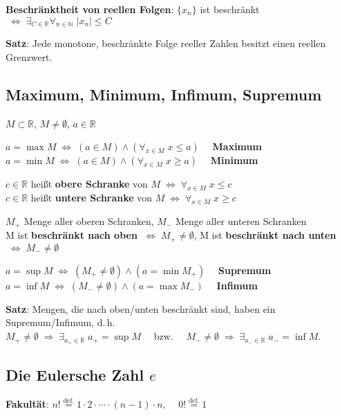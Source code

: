 \textbf{Beschränktheit von reellen Folgen}: $\{x_n\}$ ist beschränkt
$\;\Leftrightarrow\;
\exists_{C \in \mathbb{R}} \forall_{n \in \mathbb{N}}\; |x_n| \le C$

\textbf{Satz}: Jede monotone, beschränkte Folge reeller Zahlen besitzt einen
reellen Grenzwert.

\subsection{%
    Maximum, Minimum, Infimum, Supremum%
}

$M \subset \mathbb{R}$, $M \not= \emptyset$, $a \in \mathbb{R}$

$a = \max{M} \;\Leftrightarrow\;
(a \in M) \land (\forall_{x \in M}\; x \le a) \quad$ \textbf{Maximum} \\
$a = \min{M} \;\Leftrightarrow\;
(a \in M) \land (\forall_{x \in M}\; x \ge a) \quad$ \textbf{Minimum}

$c \in \mathbb{R}$ heißt \textbf{obere Schranke} von
$M \;\Leftrightarrow\; \forall_{x \in M}\; x \le c$ \\
$c \in \mathbb{R}$ heißt \textbf{untere Schranke} von
$M \;\Leftrightarrow\; \forall_{x \in M}\; x \ge c$

$M_{+}$ Menge aller oberen Schranken, $M_{-}$ Menge aller unteren Schranken \\
M ist \textbf{beschränkt nach oben}
$\;\Leftrightarrow\; M_{+} \not= \emptyset$,
M ist \textbf{beschränkt nach unten}
$\;\Leftrightarrow\; M_{-} \not= \emptyset$

$a = \sup{M} \;\Leftrightarrow\;
(M_{+} \not= \emptyset) \land (a = \min{M_{+}}) \quad$ \textbf{Supremum} \\
$a = \inf{M} \;\Leftrightarrow\;
(M_{-} \not= \emptyset) \land (a = \max{M_{-}}) \quad$ \textbf{Infimum}

\textbf{Satz}: Mengen, die nach oben/unten beschränkt sind, haben ein
Supremum/Infimum, d.\,h. \\
$M_{+} \not= \emptyset \;\Rightarrow\;
\exists_{a_{+} \in \mathbb{R}}\; a_{+} = \sup{M}\quad $ bzw.
$\quad M_{-} \not= \emptyset \;\Rightarrow\;
\exists_{a_{-} \in \mathbb{R}}\; a_{-} = \inf{M}$.

\subsection{%
    \texorpdfstring{Die Eulersche Zahl $e$}{Die Eulersche Zahl ℯ}%
}

\textbf{Fakultät}: $n! \overset{\text{def.}}{=}
1 \cdot 2 \cdot \cdots \cdot (n-1) \cdot n$,
$\quad 0! \overset{\text{def.}}{=} 1$

